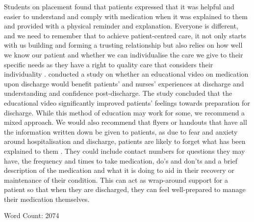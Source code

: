 \documentclass[british,12pt,a4paper]{article}
\begin{document}
Students on placement found that patients expressed that it was helpful and easier to understand and comply with medication when it was explained to them and provided with a physical reminder and explanation. Everyone is different, and we need to remember that to achieve patient-centred care, it not only starts with us building and forming a trusting relationship but also relies on how well we know our patient and whether we can individualise the care we give to their specific needs as they have a right to quality care that considers their individuality \parencite{NZNC2012}. \textcite{Sanjai2019} conducted a study on whether an educational video on medication upon discharge would benefit patients' and nurses' experiences at discharge and understanding and confidence post-discharge. The study concluded that the educational video significantly improved patients' feelings towards preparation for discharge. While this method of education may work for some, we recommend a mixed approach. We would also recommend that flyers or handouts that have all the information written down be given to patients, as due to fear and anxiety around hospitalisation and discharge, patients are likely to forget what has been explained to them \parencite{Roeung2024}. They could include contact numbers for questions they may have, the frequency and times to take medication, do's and don'ts and a brief description of the medication and what it is doing to aid in their recovery or maintenance of their condition. This can act as wrap-around support for a patient so that when they are discharged, they can feel well-prepared to manage their medication themselves.

\vfill
\begin{center}
	\large Word Count: 2074
\end{center}
\pagebreak
\doublespacing
\printbibliography
\end{document}
